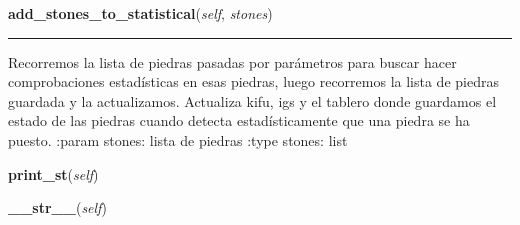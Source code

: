 \hspace{.8\funcindent}\begin{boxedminipage}{\funcwidth}

    \raggedright \textbf{add\_stones\_to\_statistical}(\textit{self}, \textit{stones})

    \vspace{-1.5ex}

    \rule{\textwidth}{0.5\fboxrule}
\setlength{\parskip}{2ex}
    Recorremos la lista de piedras pasadas por parámetros para buscar hacer
    comprobaciones estadísticas en esas piedras, luego recorremos la lista 
    de piedras guardada y la actualizamos. Actualiza kifu, igs y el tablero
    donde guardamos el estado de las piedras cuando detecta 
    estadísticamente que una piedra se ha puesto. :param stones: lista de 
    piedras :type stones: list

\setlength{\parskip}{1ex}
    \end{boxedminipage}

    \label{src:goban:Goban:print_st}

    \vspace{0.5ex}

\hspace{.8\funcindent}\begin{boxedminipage}{\funcwidth}

    \raggedright \textbf{print\_st}(\textit{self})

\setlength{\parskip}{2ex}
\setlength{\parskip}{1ex}
    \end{boxedminipage}

    \label{src:goban:Goban:__str__}

    \vspace{0.5ex}

\hspace{.8\funcindent}\begin{boxedminipage}{\funcwidth}

    \raggedright \textbf{\_\_str\_\_}(\textit{self})

\setlength{\parskip}{2ex}
\setlength{\parskip}{1ex}
    \end{boxedminipage}

